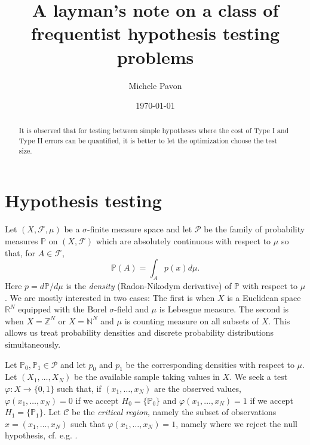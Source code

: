 \documentclass[preprint,aps,showkeys,12pt]{revtex4}
\begin{document}
\title{A layman's note on a class of frequentist hypothesis testing problems}
\author{Michele Pavon}

\date{\today}

\begin{abstract} It is observed that for testing between simple hypotheses  where the cost of Type I and Type II errors can be quantified, it is better to let the optimization choose the test size.

\end{abstract}


\maketitle

\section{Hypothesis testing}
Let $(X,\mathcal F,\mu)$ be a $\sigma$-finite measure space and let $\mathcal P$ be the family of  probability measures ${\mathbb{P}}$ on $(X,\mathcal F)$ which are absolutely continuous with respect to $\mu$ so that, for $A\in\mathcal F$,
$$ {\mathbb{P}} (A)=\int_A p(x)d\mu.
$$
Here $p=d{\mathbb{P}}/d\mu$ is the {\em density} (Radon-Nikodym derivative) of ${\mathbb{P}}$ with respect to $\mu$. We are mostly interested in two cases: The first is when $X$ is a Euclidean space ${\mathbb{R}}^N$ equipped with the Borel $\sigma$-field and $\mu$ is Lebesgue measure. The second is when $X={\mathbb{Z}}^N$ or $X={\mathbb{N}}^N$ and $\mu$ is counting measure on all subsets of $X$. This allows us treat probability densities and discrete probability distributions simultaneously. 

Let ${\mathbb{P}}_0, {\mathbb{P}}_1\in\mathcal P$ and let $p_0$ and $p_1$ be the corresponding densities with respect to $\mu$. Let $(X_1,\ldots,X_N)$ be the available sample taking values in $X$. We seek a test $\varphi: X\rightarrow \{0,1\}$ such that, if $(x_1,\ldots,x_N)$ are the observed values, $\varphi(x_1,\ldots,x_N)=0$ if we accept $H_0=\{{\mathbb{P}}_0\}$ and  $\varphi(x_1,\ldots,x_N)=1$ if we accept $H_1=\{{\mathbb{P}}_1\}$. Let $\mathcal C$ be the {\em critical region}, namely the subset of observations $x=(x_1,\ldots,x_N)$ such that $\varphi(x_1,\ldots,x_N)=1$, namely where we reject the null hypothesis, cf. e.g. \cite[Chapter 8]{Ki}.
\end{document}
